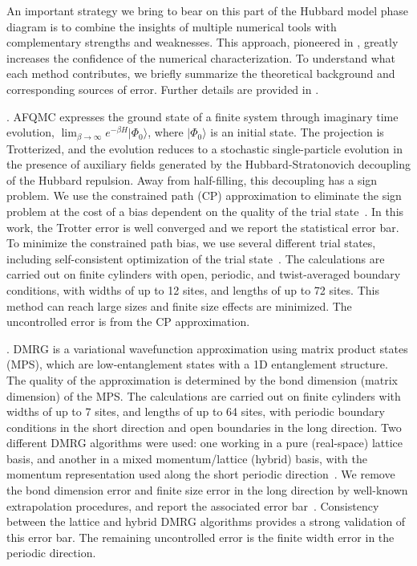 \documentclass[12pt]{article}
\begin{document}
An important strategy we bring to bear on this part of
the Hubbard model phase diagram is to combine the insights of multiple numerical tools with complementary
strengths and weaknesses. This approach, pioneered in \cite{LeBlanc2015},
greatly increases the confidence of the numerical characterization. To understand what each method
contributes, we briefly summarize the theoretical background and corresponding sources of error. 
Further details are provided in \cite{supplementary}.

. AFQMC expresses the ground state of a finite system 
through  imaginary time evolution, $\lim_{\beta \rightarrow\infty} e^{-\beta H} | \Phi_0\rangle$, where $|\Phi_0\rangle$ is an initial state.
The projection is Trotterized, and the evolution reduces to a stochastic single-particle evolution in the presence of 
auxiliary fields generated by the Hubbard-Stratonovich decoupling of the Hubbard repulsion. 
Away from half-filling, this decoupling has a sign problem. 
We use the constrained path (CP) approximation to eliminate the sign problem at the cost of a bias 
dependent on the quality of the trial state~\cite{Zhang1995,chang2008prb}. 
In this work, the Trotter error is well converged and we report the statistical error bar.
To minimize the constrained path bias, we use several different trial states, including  self-consistent optimization of the trial state~\cite{qin2016coupling}. 
The calculations are carried out on finite cylinders with open, periodic, and twist-averaged boundary conditions, 
with widths of up to 12 sites, and lengths of up to 72 sites.
This method can reach large sizes and finite size effects are minimized. The uncontrolled
error is from the CP approximation. 



. DMRG is a variational wavefunction approximation using
 matrix product states (MPS), which are low-entanglement states with a 1D entanglement structure. The
quality of the approximation is determined by the bond dimension (matrix dimension) of the MPS.
The calculations are carried out on finite cylinders with widths of up to 7 sites, and lengths of up to 64 sites, 
with periodic boundary conditions in the short direction and open boundaries 
in the long direction. Two different DMRG algorithms were used: one working in a pure (real-space) lattice basis, and
another in a mixed momentum/lattice (hybrid) basis, with the momentum representation 
used along the short periodic direction~\cite{Motruk2016}.
We remove  the bond dimension error and finite size error
in the long direction by well-known extrapolation procedures, and report the associated error bar~\cite{stoudenmire2012studying}. 
Consistency between the lattice and hybrid DMRG algorithms provides a strong validation of this error bar.
The remaining uncontrolled error is the finite width error in the periodic direction.
\end{document}
